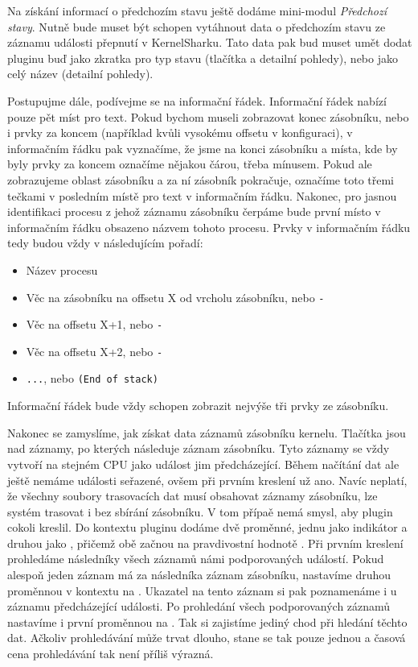 Na získání informací o předchozím stavu ještě dodáme mini-modul \emph{Předchozí stavy}. Nutně bude muset být schopen vytáhnout data o předchozím stavu ze záznamu události přepnutí v KernelSharku. Tato data pak bud muset umět dodat pluginu buď jako zkratka pro typ stavu (tlačítka a detailní pohledy), nebo jako celý název (detailní pohledy).

Postupujme dále, podívejme se na informační řádek. Informační řádek nabízí pouze pět míst pro text. Pokud bychom museli zobrazovat konec zásobníku, nebo i prvky za koncem (například kvůli vysokému offsetu v konfiguraci), v informačním řádku pak vyznačíme, že jsme na konci zásobníku a místa, kde by byly prvky za koncem označíme nějakou čárou, třeba mínusem. Pokud ale zobrazujeme oblast zásobníku a za ní zásobník pokračuje, označíme toto třemi tečkami v posledním místě pro text v informačním řádku. Nakonec, pro jasnou identifikaci procesu z jehož záznamu zásobníku čerpáme bude první místo v informačním řádku obsazeno názvem tohoto procesu. Prvky v informačním řádku tedy budou vždy v následujícím pořadí:
\begin{itemize}
  \item Název procesu
  \item Věc na zásobníku na offsetu X od vrcholu zásobníku, nebo \texttt{-}
  \item Věc na offsetu X+1, nebo \texttt{-}
  \item Věc na offsetu X+2, nebo \texttt{-}
  \item \texttt{...}, nebo \texttt{(End of stack)}
\end{itemize}
Informační řádek bude vždy schopen zobrazit nejvýše tři prvky ze zásobníku.

Nakonec se zamyslíme, jak získat data záznamů zásobníku kernelu. Tlačítka jsou nad záznamy, po kterých následuje záznam zásobníku. Tyto záznamy se vždy vytvoří na stejném CPU jako událost jim předcházející. Během načítání dat ale ještě nemáme události seřazené, ovšem při prvním kreslení už ano. Navíc neplatí, že všechny soubory trasovacích dat musí obsahovat záznamy zásobníku, lze systém trasovat i bez sbírání zásobníku. V tom přípaě nemá smysl, aby plugin cokoli kreslil. Do kontextu pluginu dodáme dvě proměnné, jednu jako indikátor  a druhou jako , přičemž obě začnou na pravdivostní hodnotě . Při prvním kreslení prohledáme následníky všech záznamů námi podporovaných událostí. Pokud alespoň jeden záznam má za následníka záznam zásobníku, nastavíme druhou proměnnou v kontextu na . Ukazatel na tento záznam si pak poznamenáme i u záznamu předcházející události. Po prohledání všech podporovaných záznamů nastavíme i první proměnnou na . Tak si zajistíme jediný chod při hledání těchto dat. Ačkoliv prohledávání může trvat dlouho, stane se tak pouze jednou a časová cena prohledávání tak není příliš výrazná.

